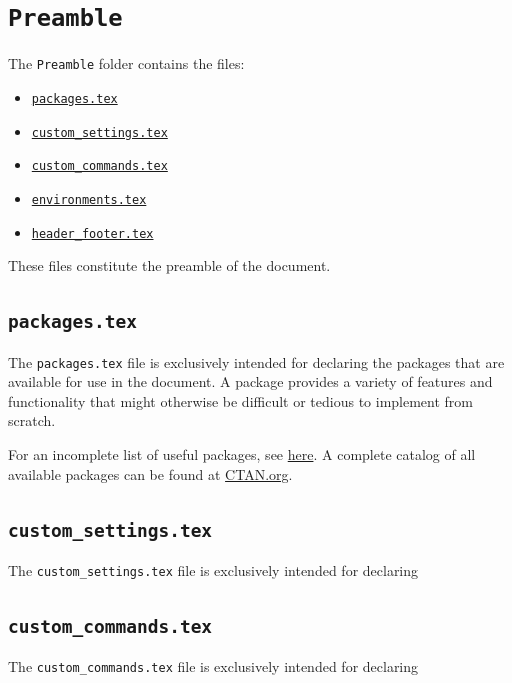\section{\texttt{Preamble}}
\label{sec:preamble}

The \texttt{Preamble} folder contains the files:
\begin{itemize}
    \item \hyperref[sec:packages.tex]{\texttt{packages.tex}}
    \item \hyperref[sec:custom_settings.tex]{\texttt{custom\_settings.tex}}
    \item \hyperref[sec:custom_commands.tex]{\texttt{custom\_commands.tex}}
    \item \hyperref[sec:environments.tex]{\texttt{environments.tex}}
    \item \hyperref[sec:header_footer.tex]{\texttt{header\_footer.tex}}
\end{itemize}
These files constitute the preamble of the document. 

\subsection{\texttt{packages.tex}}
\label{sec:packages.tex}

The \texttt{packages.tex} file is exclusively intended for declaring the packages that are available for use in the document. A package provides a variety of features and functionality that might otherwise be difficult or tedious to implement from scratch.

For an incomplete list of useful packages, see \href{https://en.wikibooks.org/wiki/LaTeX/Package_Reference}{here}. A complete catalog of all available packages can be found at \href{https://ctan.org/pkg}{CTAN.org}.

\subsection{\texttt{custom\_settings.tex}}
\label{sec:custom_settings.tex}

The \texttt{custom\_settings.tex} file is exclusively intended for declaring 

\subsection{\texttt{custom\_commands.tex}}
\label{sec:custom_commands.tex}

The \texttt{custom\_commands.tex} file is exclusively intended for declaring 

